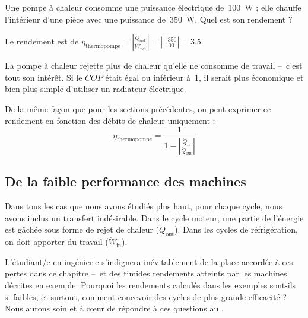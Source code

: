 		\begin{anexample}
			Une pompe à chaleur consomme une puissance électrique de~\SI{100}{\watt} ; elle chauffe l’intérieur d’une pièce avec une puissance de~\SI{350}{\watt}. Quel est son rendement ?
			
			\begin{answer}
				Le rendement est de $\eta_\text{thermopompe} = \left| \frac{\dot{Q}_\text{out}}{\dot{W}_\text{net}} \right| = \left| \frac{\num{-350}}{\num{+100}} \right| = \num{3.5}$. 
					\begin{remark} La pompe à chaleur rejette plus de chaleur qu’elle ne consomme de travail –\ c’est tout son intérêt. Si le $COP$ était égal ou inférieur à~\num{1}, il serait plus économique et bien plus simple d’utiliser un radiateur électrique.\end{remark}
			\end{answer}
		\end{anexample}


		De la même façon que pour les sections précédentes, on peut exprimer ce rendement en fonction des débits de chaleur uniquement :
		\begin{equation}
			\eta_\text{thermopompe} = \frac{1}{1 - \left| \frac{\dot{Q}_\text{in}}{\dot{Q}_\text{out}} \right|}
			\label{eq_rendement_thermopompe_qin_qout}
		\end{equation}




	\subsection{De la faible performance des machines}

		Dans tous les cas que nous avons étudiés plus haut, pour chaque cycle, nous avons inclus un transfert indésirable. Dans le cycle moteur, une partie de l’énergie est gâchée sous forme de rejet de chaleur ($\dot{Q}_\text{out}$). Dans les cycles de réfrigération, on doit apporter du travail ($\dot{W}_\text{in}$).

		L’étudiant/e en ingénierie s’indignera inévitablement de la place accordée à ces pertes dans ce chapitre --\ et des timides rendements atteints par les machines décrites en exemple. Pourquoi les rendements calculés dans les exemples sont-ils si faibles, et surtout, comment concevoir des cycles de plus grande efficacité ? Nous aurons soin et à cœur de répondre à ces questions au \courssept.
